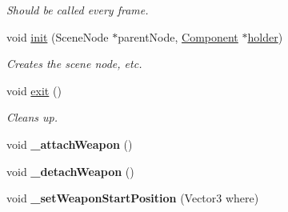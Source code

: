 \begin{DoxyCompactItemize}
\begin{DoxyCompactList}\small\item\em \-Should be called every frame. \end{DoxyCompactList}\item 
\hypertarget{classWeaponInHand_aff6d3b6ad7c86f9a7563d6bb7e4b9f83}{
void \hyperlink{classWeaponInHand_aff6d3b6ad7c86f9a7563d6bb7e4b9f83}{init} (\-Scene\-Node $\ast$parent\-Node, \hyperlink{classComponent}{\-Component} $\ast$\hyperlink{classWeaponInHand_a57c4ee1eadbe84472318dfa13b7b1848}{holder})}
\label{dc/d08/classWeaponInHand_aff6d3b6ad7c86f9a7563d6bb7e4b9f83}

\begin{DoxyCompactList}\small\item\em \-Creates the scene node, etc. \end{DoxyCompactList}\item 
\hypertarget{classWeaponInHand_abacdc20ee105851f295a00260b3e1b2a}{
void \hyperlink{classWeaponInHand_abacdc20ee105851f295a00260b3e1b2a}{exit} ()}
\label{dc/d08/classWeaponInHand_abacdc20ee105851f295a00260b3e1b2a}

\begin{DoxyCompactList}\small\item\em \-Cleans up. \end{DoxyCompactList}\item 
\hypertarget{classWeaponInHand_a639c9ecada596c637d1041d73542e24a}{
void {\bfseries \-\_\-attach\-Weapon} ()}
\label{dc/d08/classWeaponInHand_a639c9ecada596c637d1041d73542e24a}

\item 
\hypertarget{classWeaponInHand_a51734c78679ff03cc4b487cdd98f1474}{
void {\bfseries \-\_\-detach\-Weapon} ()}
\label{dc/d08/classWeaponInHand_a51734c78679ff03cc4b487cdd98f1474}

\item 
\hypertarget{classWeaponInHand_a1daaef674e1b24e77b707ae14534feb3}{
void {\bfseries \-\_\-set\-Weapon\-Start\-Position} (\-Vector3 where)}
\label{dc/d08/classWeaponInHand_a1daaef674e1b24e77b707ae14534feb3}

\end{DoxyCompactItemize}
